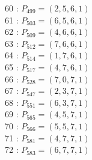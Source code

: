 \documentclass{article}
\begin{document}
{\begin{multicols}{3}
60 : $P_{499}=( 2, 5, 6, 1 )$\\
61 : $P_{503}=( 6, 5, 6, 1 )$\\
62 : $P_{509}=( 4, 6, 6, 1 )$\\
63 : $P_{512}=( 7, 6, 6, 1 )$\\
64 : $P_{514}=( 1, 7, 6, 1 )$\\
65 : $P_{517}=( 4, 7, 6, 1 )$\\
66 : $P_{528}=( 7, 0, 7, 1 )$\\
67 : $P_{547}=( 2, 3, 7, 1 )$\\
68 : $P_{551}=( 6, 3, 7, 1 )$\\
69 : $P_{565}=( 4, 5, 7, 1 )$\\
70 : $P_{566}=( 5, 5, 7, 1 )$\\
71 : $P_{581}=( 4, 7, 7, 1 )$\\
72 : $P_{583}=( 6, 7, 7, 1 )$\\
\end{multicols}


%


%


}%
\end{document}
